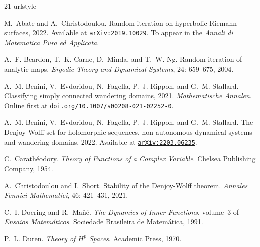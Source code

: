 \documentclass[a4paper,11pt]{article}
\theoremstyle{plain}
\theoremstyle{definition}
\theoremstyle{definition}
\begin{document}
\begin{thebibliography}{21}
\providecommand{\natexlab}[1]{#1}
\providecommand{\url}[1]{\texttt{#1}}
\expandafter\ifx\csname urlstyle\endcsname\relax
  \providecommand{\doi}[1]{doi: #1}\else
  \providecommand{\doi}{doi: \begingroup \urlstyle{rm}\Url}\fi

M.~Abate and A.~Christodoulou.
\newblock Random iteration on hyperbolic {Riemann} surfaces, 2022.
\newblock Available at
  \href{https://arxiv.org/abs/2109.10029}{\texttt{arXiv:2019.10029}}. To appear
  in the \textit{Annali di Matematica Pura ed Applicata}.

A.~F. Beardon, T.~K. Carne, D.~Minda, and T.~W. Ng.
\newblock Random iteration of analytic maps.
\newblock \emph{Ergodic Theory and Dynamical Systems}, 24: 659--675,
  2004.

A.~M. Benini, V.~Evdoridou, N.~Fagella, P.~J. Rippon, and G.~M. Stallard.
\newblock Classifying simply connected wandering domains, 2021.
\newblock \textit{Mathematische Annalen}. Online first at
  \href{https://link.springer.com/article/10.1007/s00208-021-02252-0}{\texttt{doi.org/10.1007/s00208-021-02252-0}}.

A.~M. Benini, V.~Evdoridou, N.~Fagella, P.~J. Rippon, and G.~M. Stallard.
\newblock The {Denjoy-Wolff} set for holomorphic sequences, non-autonomous
  dynamical systems and wandering domains, 2022.
\newblock Available at
  \href{https://arxiv.org/abs/2203.06235}{\texttt{arXiv:2203.06235}}.

C.~Carath{\'e}odory.
\newblock \emph{Theory of Functions of a Complex Variable}.
\newblock Chelsea Publishing Company, 1954.

A.~Christodoulou and I.~Short.
\newblock Stability of the {Denjoy-Wolff} theorem.
\newblock \emph{Annales Fennici Mathematici}, 46: 421--431, 2021.

C.~I. Doering and R.~Ma{\~n\'e}.
\newblock \emph{The Dynamics of Inner Functions}, volume~3 of \emph{Ensaios
  Matem{\'a}ticos}.
\newblock Sociedade Brasileira de Matem{\'a}tica, 1991.

P.~L. Duren.
\newblock \emph{Theory of $H^p$ Spaces}.
\newblock Academic Press, 1970.


\end{thebibliography}
\end{document}
